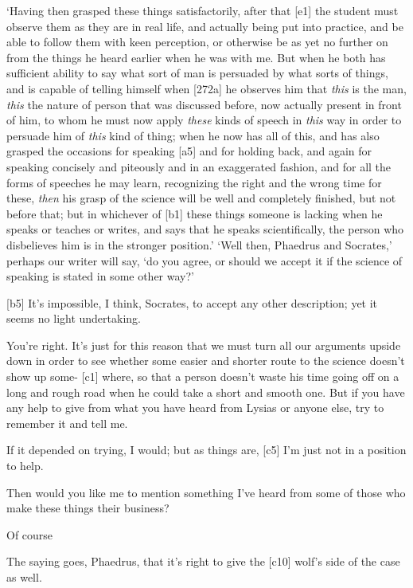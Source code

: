 ‘Having then grasped these things satisfactorily, after that {[}e1{]}
the student must observe them as they are in real life, and actually
being put into practice, and be able to follow them with keen
perception, or otherwise be as yet no further on from the things he
heard earlier when he was with me. But when he both has sufficient
ability to say what sort of man is persuaded by what sorts of things,
and is capable of telling himself when {[}272a{]} he observes him that
{\em this} is the man, {\em this} the nature of person that was
discussed before, now actually present in front of him, to whom he must
now apply {\em these} kinds of speech in {\em this} way in order to
persuade him of {\em this} kind of thing; when he now has all of this,
and has also grasped the occasions for speaking {[}a5{]} and for holding
back, and again for speaking concisely and piteously and in an
exaggerated fashion, and for all the forms of speeches he may learn,
recognizing the right and the wrong time for these, {\em then} his grasp
of the science will be well and completely finished, but not before
that; but in whichever of {[}b1{]} these things someone is lacking when
he speaks or teaches or writes, and says that he speaks scientifically,
the person who disbelieves him is in the stronger position.' ‘Well then,
Phaedrus and Socrates,' perhaps our writer will say, ‘do you agree, or
should we accept it if the science of speaking is stated in some other
way?'

{[}b5{]}  It's impossible, I think, Socrates, to accept any
other description; yet it seems no light undertaking.

 You're right. It's just for this reason that we must turn all
our arguments upside down in order to see whether some easier and
shorter route to the science doesn't show up some- {[}c1{]} where, so
that a person doesn't waste his time going off on a long and rough road
when he could take a short and smooth one. But if you have any help to
give from what you have heard from Lysias or anyone else, try to
remember it and tell me.

 If it depended on trying, I would; but as things are, {[}c5{]}
I'm just not in a position to help.

 Then would you like me to mention something I've heard from
some of those who make these things their business?

 Of course

 The saying goes, Phaedrus, that it's right to give the
{[}c10{]} wolf's side of the case as well.

